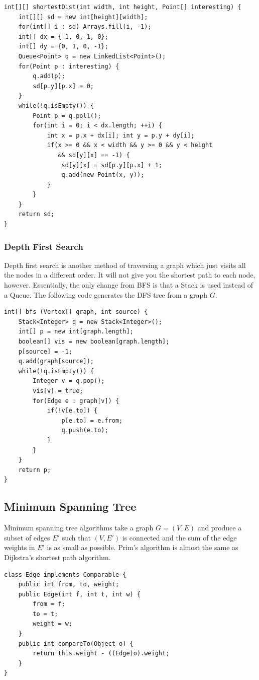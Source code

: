 \documentclass[a4paper,12pt]{article}
\begin{document}
\begin{lstlisting}
int[][] shortestDist(int width, int height, Point[] interesting) {
	int[][] sd = new int[height][width];
	for(int[] i : sd) Arrays.fill(i, -1);
	int[] dx = {-1, 0, 1, 0};
	int[] dy = {0, 1, 0, -1};
	Queue<Point> q = new LinkedList<Point>();
	for(Point p : interesting) {
		q.add(p);
		sd[p.y][p.x] = 0;
	}
	while(!q.isEmpty()) {
		Point p = q.poll();
		for(int i = 0; i < dx.length; ++i) {
			int x = p.x + dx[i]; int y = p.y + dy[i];
			if(x >= 0 && x < width && y >= 0 && y < height 
			   && sd[y][x] == -1) {
				sd[y][x] = sd[p.y][p.x] + 1;
				q.add(new Point(x, y));
			}
		}
	}
	return sd;
}
\end{lstlisting} 

\subsubsection{Depth First Search}

Depth first search is another method of traversing a graph which just visits all the nodes in a different order. It will not give you the shortest path to each node, however. Essentially, the only change from BFS is that a Stack is used instead of a Queue. The following code generates the DFS tree from a graph $G$.

\begin{lstlisting}
int[] bfs (Vertex[] graph, int source) {
	Stack<Integer> q = new Stack<Integer>();
	int[] p = new int[graph.length];
	boolean[] vis = new boolean[graph.length];
	p[source] = -1;
	q.add(graph[source]);
	while(!q.isEmpty()) {
		Integer v = q.pop();
		vis[v] = true;
		for(Edge e : graph[v]) {
			if(!v[e.to]) {
				p[e.to] = e.from;
				q.push(e.to);
			}
		}
	}
	return p;
}
\end{lstlisting}

\subsection{Minimum Spanning Tree}

Minimum spanning tree algorithms take a graph $G = (V,E)$ and produce a subset of edges $E'$ such that $(V,E')$ is connected and the sum of the edge weights in $E'$ is as small as possible. Prim's algorithm is almost the same as Dijkstra's shortest path algorithm.

\begin{lstlisting}
class Edge implements Comparable {
	public int from, to, weight;
	public Edge(int f, int t, int w) {
		from = f;
		to = t;
		weight = w;
	}
	public int compareTo(Object o) {
		return this.weight - ((Edge)o).weight;
	}
}
\end{lstlisting}
\end{document}
